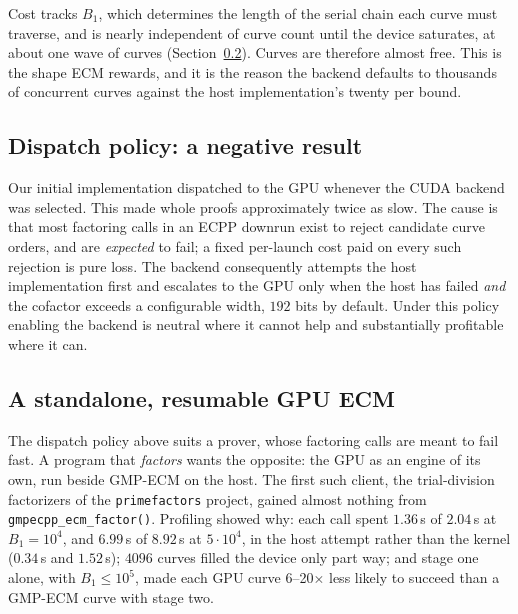 \documentclass[11pt,a4paper]{article}
\newcommand{\code}[1]{\texttt{#1}}
\begin{document}
Cost tracks $B_1$, which determines the length of the serial chain each
curve must traverse, and is nearly independent of curve count until the
device saturates, at about one wave of curves (Section~\ref{sec:cudaecm}). Curves are therefore almost free. This is the shape ECM
rewards, and it is the reason the backend defaults to thousands of
concurrent curves against the host implementation's twenty per bound.

\subsection{Dispatch policy: a negative result}

Our initial implementation dispatched to the GPU whenever the CUDA
backend was selected. This made whole proofs approximately twice as slow.
The cause is that most factoring calls in an ECPP downrun exist to reject
candidate curve orders, and are \emph{expected} to fail; a fixed
per-launch cost paid on every such rejection is pure loss. The backend
consequently attempts the host implementation first and escalates to the
GPU only when the host has failed \emph{and} the cofactor exceeds a
configurable width, $192$ bits by default. Under this policy enabling the
backend is neutral where it cannot help and substantially profitable
where it can.

\subsection{A standalone, resumable GPU ECM}
\label{sec:cudaecm}

The dispatch policy above suits a prover, whose factoring calls are meant to fail fast. A program
that \emph{factors} wants the opposite: the GPU as an engine of its own, run beside GMP-ECM on the
host. The first such client, the trial-division factorizers of the \code{primefactors} project,
gained almost nothing from \code{gmpecpp\_ecm\_factor()}. Profiling showed why: each call
spent $1.36$\,s of $2.04$\,s at $B_1 = 10^4$, and $6.99$\,s of $8.92$\,s at $5\cdot10^4$, in the
host attempt rather than the kernel ($0.34$\,s and $1.52$\,s); $4096$ curves filled the device only
part way; and stage one alone, with $B_1 \le 10^5$, made each GPU curve 6--20$\times$ less likely
to succeed than a GMP-ECM curve with stage two.
\end{document}
